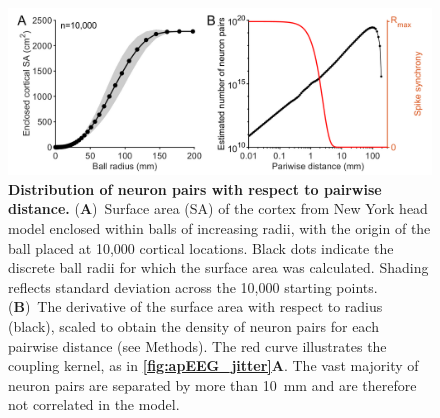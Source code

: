 \begin{figure}[h!]
    \centering
    \includegraphics[width=13.2cm]{Figures/chapter3/figureS4.png}
    \caption{\textbf{Distribution of neuron pairs with respect to pairwise distance.} (\textbf{A})~Surface area (SA) of the cortex from New York head model enclosed within balls of increasing radii, with the origin of the ball placed at 10,000 cortical locations. Black dots indicate the discrete ball radii for which the surface area was calculated. Shading reflects standard deviation across the 10,000 starting points. (\textbf{B})~The derivative of the surface area with respect to radius (black), scaled to obtain the density of neuron pairs for each pairwise distance (see Methods). The red curve illustrates the coupling kernel, as in \textbf{\autoref{fig:apEEG_jitter}A}. The vast majority of neuron pairs are separated by more than 10~\unit{\milli\meter} and are therefore not correlated in the model.} 
    \label{fig:counting_pairwise}
\end{figure}

